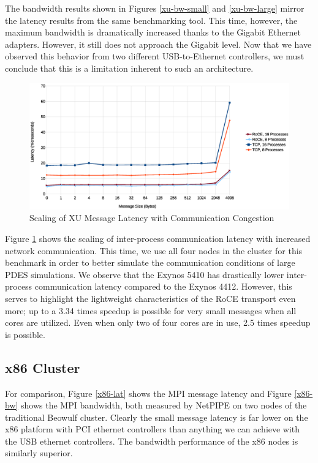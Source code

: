 \documentclass[11pt]{book}
\begin{document}
The bandwidth results shown in Figures \ref{xu-bw-small} and \ref{xu-bw-large} mirror the
latency results from the same benchmarking tool.  This time, however, the maximum
bandwidth is dramatically increased thanks to the Gigabit Ethernet adapters.  However, it
still does not approach the Gigabit level.  Now that we have observed this behavior from
two different USB-to-Ethernet controllers, we must conclude that this is a limitation
inherent to such an architecture.

\begin{figure}
\includegraphics[width=\textwidth]{xu_imb}
\caption{Scaling of XU Message Latency with Communication Congestion}
\label{xu-imb-low}
\end{figure}

Figure \ref{xu-imb-low} shows the scaling of inter-process communication latency with
increased network communication.  This time, we use all four nodes in the cluster for this
benchmark in order to better simulate the communication conditions of large PDES
simulations.  We observe that the Exynos 5410 has drastically lower inter-process
communication latency compared to the Exynos 4412.  However, this serves to highlight the
lightweight characteristics of the RoCE transport even more; up to a 3.34 times speedup is
possible for very small messages when all cores are utilized.  Even when only two of four
cores are in use, 2.5 times speedup is possible.

\subsection{x86 Cluster}

For comparison, Figure \ref{x86-lat} shows the MPI message latency and Figure \ref{x86-bw}
shows the MPI bandwidth, both measured by NetPIPE on two nodes of the traditional Beowulf
cluster. Clearly the small message latency is far lower on the x86 platform with PCI
ethernet controllers than anything we can achieve with the USB ethernet controllers. The
bandwidth performance of the x86 nodes is similarly superior.
\end{document}
